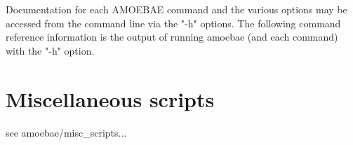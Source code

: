 \documentclass[12pt,letterpaper]{article}
\begin{document}
\begin{linenumbers}

Documentation for each AMOEBAE command and the various options may be accessed
from the command line via the "-h" options. The following command reference
information is the output of running amoebae (and each command) with the "-h"
option.




\section{Miscellaneous scripts}

see amoebae/misc\_scripts...



\printglossaries %

\newpage
\end{linenumbers}

 
\begin{multicols}{2}
{\footnotesize %
}
\end{multicols}
\end{document}
